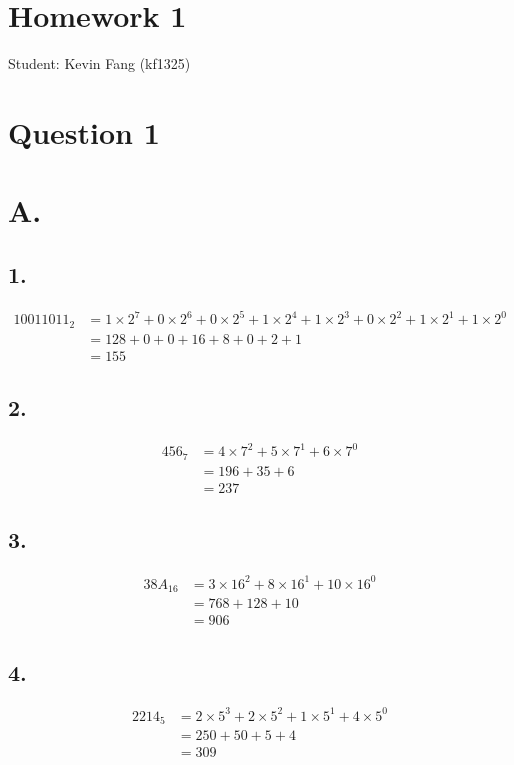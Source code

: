 \documentclass[10pt]{article}
\begin{document}
\section*{Homework 1}
Student: Kevin Fang (kf1325)

\section*{Question 1}
\section*{A.}
\subsection*{1.}

$$
\begin{aligned}
10011011_{2} & =1 \times 2^{7}+0 \times 2^{6}+0 \times 2^{5}+1 \times 2^{4}+1 \times 2^{3}+0 \times 2^{2}+1 \times 2^{1}+1 \times 2^{0} \\
& =128+0+0+16+8+0+2+1 \\
& =155
\end{aligned}
$$

\subsection*{2.}

$$
\begin{aligned}
456_{7} & =4 \times 7^{2}+5 \times 7^{1}+6 \times 7^{0} \\
& =196+35+6 \\
& =237
\end{aligned}
$$

\subsection*{3.}

$$
\begin{aligned}
38 A_{16} & =3 \times 16^{2}+8 \times 16^{1}+10 \times 16^{0} \\
& =768+128+10 \\
& =906
\end{aligned}
$$

\subsection*{4.}

$$
\begin{aligned}
2214_{5} & =2 \times 5^{3}+2 \times 5^{2}+1 \times 5^{1}+4 \times 5^{0} \\
& =250+50+5+4 \\
& =309
\end{aligned}
$$
\end{document}
